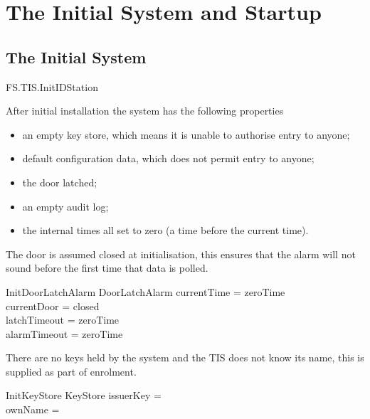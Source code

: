 \chapter{The Initial System and Startup}
\label{sec:Start}
\section{The Initial System}

\begin{traceunit}{FS.TIS.InitIDStation}
\end{traceunit}

After initial installation the system has the following properties
\begin{itemize}
\item
an empty key store, which means it is unable to authorise entry to anyone;
\item
default configuration data, which does not permit entry to anyone;
\item
the door latched;
\item
an empty audit log;
\item
the internal times all set to zero (a time before the current time).
\end{itemize}

The door is assumed closed at initialisation, this ensures that the alarm
will not sound before the first time that data is polled.

\begin{schema}{InitDoorLatchAlarm}
        DoorLatchAlarm
\where
	currentTime = zeroTime
\\	currentDoor = closed
\\	latchTimeout = zeroTime
\\	alarmTimeout = zeroTime
\end{schema}

There are no keys held by the system and the TIS does not know its
name, this is supplied as part of enrolment.

\begin{schema}{InitKeyStore}
        KeyStore
\where
        issuerKey = \emptyset
\\      ownName = \Nil
\end{schema}

